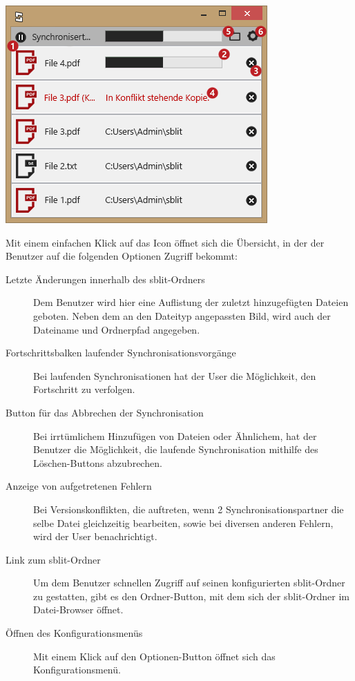 \includegraphics[]{images/systemtray.png}

Mit einem einfachen Klick auf das Icon öffnet sich die Übersicht, in der der
Benutzer auf die folgenden Optionen Zugriff bekommt:

\begin{description}

	\item[{Letzte Änderungen innerhalb des sblit-Ordners}]
		Dem Benutzer wird hier eine Auflistung der zuletzt hinzugefügten Dateien
		geboten. Neben dem an den Dateityp angepassten Bild, wird auch der Dateiname
		und Ordnerpfad angegeben.

	\item[{Fortschrittsbalken laufender Synchronisationsvorgänge}]
		Bei laufenden Synchronisationen hat der User die Möglichkeit, den
		Fortschritt zu verfolgen.

	\item[{Button für das Abbrechen der Synchronisation}]
		Bei irrtümlichem Hinzufügen von Dateien oder Ähnlichem, hat der Benutzer die
		 Möglichkeit, die laufende Synchronisation mithilfe des Löschen-Buttons
		abzubrechen.

	\item[{Anzeige von aufgetretenen Fehlern}]
		Bei Versionskonflikten, die auftreten, wenn 2 Synchronisationspartner die
		selbe Datei gleichzeitig bearbeiten, sowie bei diversen anderen Fehlern,
		wird der User benachrichtigt.

	\item[{Link zum sblit-Ordner}]
		Um dem Benutzer schnellen Zugriff auf seinen konfigurierten sblit-Ordner zu
		gestatten, gibt es den Ordner-Button, mit dem sich der sblit-Ordner im
		Datei-Browser öffnet.

	\item[{Öffnen des Konfigurationsmenüs}]
		Mit einem Klick auf den Optionen-Button öffnet sich das Konfigurationsmenü.
\end{description}
